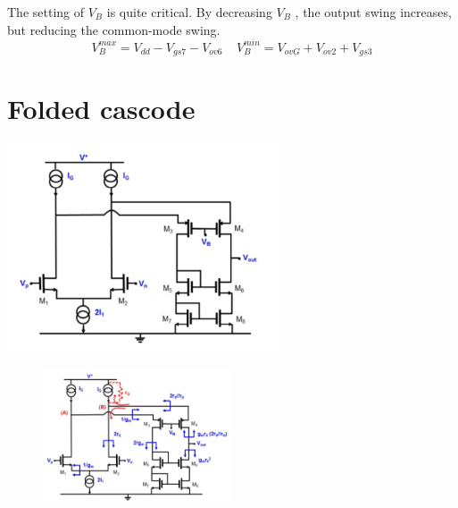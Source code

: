 The setting of $V_B$ is quite critical. By decreasing $V_B$ , the output swing
increases, but reducing the common-mode swing.\\
\begin{equation}
V_B^{max}=V_{dd}-V_{gs7}-V_{ov6}\ \ \ \ \ V_B^{min}=V_{ovG}+V_{ov2}+V_{gs3}
\end{equation}

\section{Folded cascode}
\centering
\includegraphics[width=0.6\textwidth]{foldedcascode.png}\\
\raggedright

\begin{figure}
\includegraphics[width=0.5\textwidth]{foldedcascoderes.png}
\end{figure}

